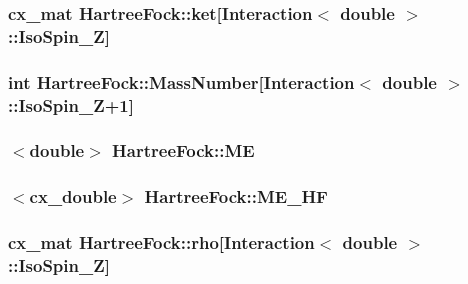 \hypertarget{class_hartree_fock_a78ba84d83058ad9c7db287beebb154d4}{
\subsubsection[{ket}]{\setlength{\rightskip}{0pt plus 5cm}cx\-\_\-mat Hartree\-Fock\-::ket\mbox{[}{\bf Interaction}$<$ double $>$\-::Iso\-Spin\-\_\-\-Z\mbox{]}\hspace{0.3cm}{\ttfamily [private]}}}\label{class_hartree_fock_a78ba84d83058ad9c7db287beebb154d4}
\hypertarget{class_hartree_fock_a18404222b2f400fb9c9985e0b7c7e664}{
\subsubsection[{Mass\-Number}]{\setlength{\rightskip}{0pt plus 5cm}int Hartree\-Fock\-::\-Mass\-Number\mbox{[}{\bf Interaction}$<$ double $>$\-::Iso\-Spin\-\_\-\-Z+1\mbox{]}\hspace{0.3cm}{\ttfamily [private]}}}\label{class_hartree_fock_a18404222b2f400fb9c9985e0b7c7e664}
\hypertarget{class_hartree_fock_a4a6514cfef19a943db8cb06b245b2f93}{
\subsubsection[{M\-E}]{$<$double$>$ Hartree\-Fock\-::\-M\-E\hspace{0.3cm}{\ttfamily [private]}}}\label{class_hartree_fock_a4a6514cfef19a943db8cb06b245b2f93}
\hypertarget{class_hartree_fock_abfd928be86a6d127aff8d8c928d30695}{
\subsubsection[{M\-E\-\_\-\-H\-F}]{$<$cx\-\_\-double$>$ Hartree\-Fock\-::\-M\-E\-\_\-\-H\-F\hspace{0.3cm}{\ttfamily [private]}}}\label{class_hartree_fock_abfd928be86a6d127aff8d8c928d30695}
\hypertarget{class_hartree_fock_a1f460784edc46e9b41d4ea047ef3a3a1}{
\subsubsection[{rho}]{\setlength{\rightskip}{0pt plus 5cm}cx\-\_\-mat Hartree\-Fock\-::rho\mbox{[}{\bf Interaction}$<$ double $>$\-::Iso\-Spin\-\_\-\-Z\mbox{]}\hspace{0.3cm}{\ttfamily [private]}}}\label{class_hartree_fock_a1f460784edc46e9b41d4ea047ef3a3a1}
